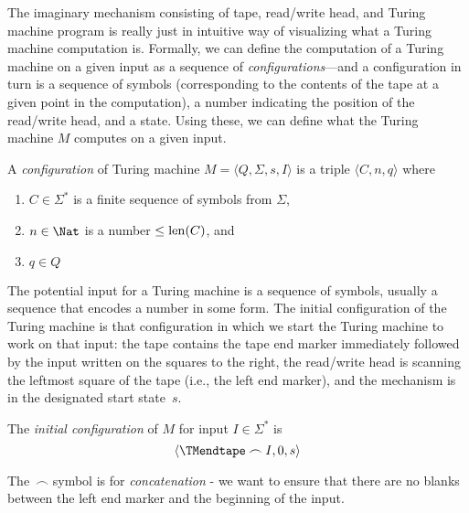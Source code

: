 \documentclass[../../include/open-logic-section]{subfiles}
\begin{document}

\begin{explain}
The imaginary mechanism consisting of tape, read/write head, and
Turing machine program is really just in intuitive way of visualizing
what a Turing machine computation is.  Formally, we can define the
computation of a Turing machine on a given input as a sequence of
\emph{configurations}---and a configuration in turn is a sequence of
symbols (corresponding to the contents of the tape at a given point in
the computation), a number indicating the position of the read/write
head, and a state.  Using these, we can define what the Turing machine
$M$ computes on a given input.
\end{explain}

\begin{defn}
A \emph{configuration} of Turing machine $M = \langle Q, \Sigma, s,
I\rangle$ is a triple $\langle C, n, q\rangle$ where
\begin{enumerate}
\item $C \in \Sigma^*$ is a finite sequence of symbols from $\Sigma$,
\item $n \in \Nat$ is a number $\le \mathrm{len}(C)$, and
\item $q \in Q$
\end{enumerate}
\end{defn}

\begin{explain}
The potential input for a Turing machine is a sequence of symbols,
usually a sequence that encodes a number in some form.  The initial
configuration of the Turing machine is that configuration in which we
start the Turing machine to work on that input: the tape contains the
tape end marker immediately followed by the input written on the
squares to the right, the read/write head is scanning the leftmost
square of the tape (i.e., the left end marker), and the mechanism is
in the designated start state~$s$.
\end{explain}

\begin{defn}
The \emph{initial configuration} of $M$ for input $I \in \Sigma^*$ is
\[
\langle \TMendtape \frown I, 0, s\rangle
\]
\end{defn}

\begin{explain}
The~$\frown$ symbol is for \emph{concatenation} - we want to
ensure that there are no blanks between the left end marker and
the beginning of the input.
\end{explain}
\end{document}

